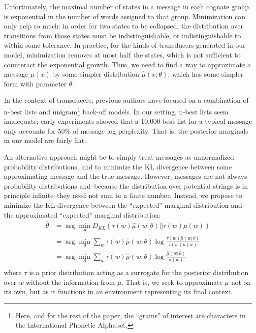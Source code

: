 \documentclass[11pt,a4paper]{article}
\begin{document}
Unfortunately, the maximal number of states in a message in each
cognate group is exponential in the number of words assigned to
that group. Minimization can only help so much: in order for two
states to be collapsed, the distribution over transitions from those
states must be indistinguishable, or indistinguishable to within
some tolerance. In practice, for the kinds of transducers generated
in our model, minimization removes at most half the states, which
is not sufficient to counteract the exponential growth. Thus, we
need to find a way to approximate a message $\mu(x)$ by some simpler
distribution $\hat\mu(x;\theta)$, which has some simpler form with
parameter $\theta$.

In the context of transducers, previous authors have focused on a
combination of n-best lists and unigram\footnote{Here, and for the
rest of the paper, the ``grams'' of interest are characters in the
International Phonetic Alphabet.} back-off models. \cite{dreyer2009graphical}
In our setting, n-best lists seem inadequate; early experiments
showed that a 10,000-best list for a typical message only accounts
for 50\% of message log perplexity. That is, the posterior marginals in
our model are fairly flat.

An alternative approach might be to simply treat messages as
unnormalized probability distributions, and to minimize the KL
divergence between some approximating message and the true message.
However, messages are not always probability distributions and--because
the distribution over potential strings is in principle infinite--they
need not sum to a finite number. Instead, we propose to minimize
the KL divergence between the ``expected'' marginal distribution
and the approximated ``expected'' marginal distribution:
\begin{equation}
  \begin{split}
    \hat\theta &= \arg\!\min_{\theta} D_{KL}(\tau(w)\hat\mu(w;\theta)||\tau(w)\mu(w) ) \\
    &= \arg\!\min_{\theta} \sum_w \tau(w) \hat\mu(w;\theta) \log \frac{\tau(w)\hat\mu(w;\theta)}{\tau(w)\mu(w)} \\
    &= \arg\!\min_{\theta} \sum_w \tau(w) \hat\mu(w;\theta) \log \frac{\hat\mu(w;\theta)}{\mu(w)} \\
   \end{split}
 \end{equation}
where $\tau$ is a prior distribution acting as a surrogate for the posterior
distribution over $w$ without the information from $\mu$. That is, we 
seek to approximate $\mu$ not on its own, but as it functions in
an environment representing its final context. 
\end{document}
